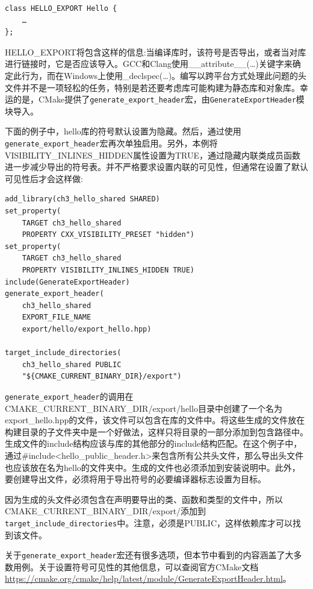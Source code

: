 \begin{lstlisting}[style=styleCXX]
class HELLO_EXPORT Hello {
	…
};
\end{lstlisting}

HELLO\_EXPORT将包含这样的信息:当编译库时，该符号是否导出，或者当对库进行链接时，它是否应该导入。GCC和Clang使用\_\_attribute\_\_(…)关键字来确定此行为，而在Windows上使用\_declspec(…)。编写以跨平台方式处理此问题的头文件并不是一项轻松的任务，特别是若还要考虑库可能构建为静态库和对象库。幸运的是，CMake提供了\texttt{generate\_export\_header}宏，由\texttt{GenerateExportHeader}模块导入。

下面的例子中，hello库的符号默认设置为隐藏。然后，通过使用\texttt{generate\_export\_header}宏再次单独启用。另外，本例将VISIBILITY\_INLINES\_HIDDEN属性设置为TRUE，通过隐藏内联类成员函数进一步减少导出的符号表。并不严格要求设置内联的可见性，但通常在设置了默认可见性后才会这样做:

\begin{lstlisting}[style=styleCMake]
add_library(ch3_hello_shared SHARED)
set_property(
	TARGET ch3_hello_shared
	PROPERTY CXX_VISIBILITY_PRESET "hidden")
set_property(
	TARGET ch3_hello_shared
	PROPERTY VISIBILITY_INLINES_HIDDEN TRUE)
include(GenerateExportHeader)
generate_export_header(
	ch3_hello_shared
	EXPORT_FILE_NAME
	export/hello/export_hello.hpp)

target_include_directories(
	ch3_hello_shared PUBLIC
	"${CMAKE_CURRENT_BINARY_DIR}/export")
\end{lstlisting}

\texttt{generate\_export\_header}的调用在CMAKE\_CURRENT\_BINARY\_DIR/export/hello目录中创建了一个名为export\_hello.hpp的文件，该文件可以包含在库的文件中。将这些生成的文件放在构建目录的子文件夹中是一个好做法，这样只将目录的一部分添加到包含路径中。生成文件的include结构应该与库的其他部分的include结构匹配。在这个例子中，通过\#include<hello\_public\_header.h>来包含所有公共头文件，那么导出头文件也应该放在名为hello的文件夹中。生成的文件也必须添加到安装说明中。此外，要创建导出文件，必须将用于导出符号的必要编译器标志设置为目标。

因为生成的头文件必须包含在声明要导出的类、函数和类型的文件中，所以CMAKE\_CURRENT\_BINARY\_DIR/export/添加到\texttt{target\_include\_directories}中。注意，必须是PUBLIC，这样依赖库才可以找到该文件。

关于\texttt{generate\_export\_header}宏还有很多选项，但本节中看到的内容涵盖了大多数用例。关于设置符号可见性的其他信息，可以查阅官方CMake文档\url{https://cmake.org/cmake/help/latest/module/GenerateExportHeader.html}。

